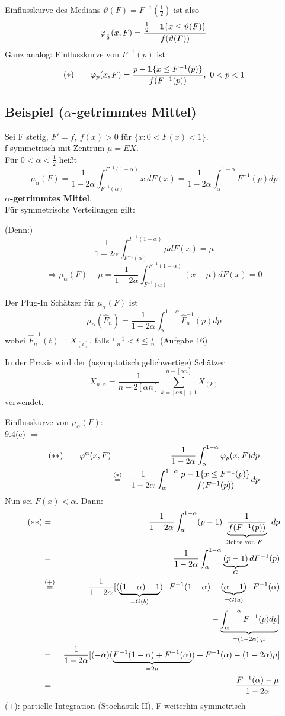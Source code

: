 \documentclass[a4paper,11pt,twoside,titlepage]{article}
\newcommand{\ind}{\text{\bf{1}}} %
\begin{document}
Einflusskurve des Medians $\vartheta(F)=F^{-1}(\frac12)$ ist also
\[\varphi_{\frac12}(x,F)=\frac{\frac12-\ind\{x\leq\vartheta(F)\}}{f(\vartheta(F))}\]
Ganz analog: Einflusskurve von $F^{-1}(p)$ ist
\[(\ast)\qquad\varphi_p(x,F)=\frac{p-\ind\{x\leq F^{-1}(p)\}}{f(F^{-1}(p))},\ 0<p<1\]

\subsection{Beispiel ($\alpha$-getrimmtes Mittel)}
Sei F stetig, $F'=f,\ f(x)>0$ für $\{x:0<F(x)<1\}$.\\
f symmetrisch mit Zentrum $\mu=EX$.\\
Für $0<\alpha<\frac12$ heißt
$$\mu_\alpha(F)=\frac{1}{1-2\alpha}\int_{F^{-1}(\alpha)}^{F^{-1}(1-\alpha)}x\ dF(x)=\frac{1}{1-2\alpha}\int_\alpha^{1-\alpha}F^{-1}(p)dp$$
\textbf{$\alpha$-getrimmtes Mittel}.\\
Für symmetrische Verteilungen gilt:\\

(Denn:)
$$\frac{1}{1-2\alpha}\int_{F^{-1}(\alpha)}^{F^{-1}(1-\alpha)}\mu dF(x)=\mu$$
$$\Rightarrow\mu_\alpha(F)-\mu=\frac{1}{1-2\alpha}\int_{F^{-1}(\alpha)}^{F^{-1}(1-\alpha)}(x-\mu)dF(x)=0$$

Der Plug-In Schätzer für $\mu_\alpha(F)$ ist 
$$\mu_\alpha(\hat F_n)=\frac{1}{1-2\alpha}\int_{\alpha}^{1-\alpha}
\hat F_n^{-1}(p)dp$$
wobei $\hat F_n^{-1}(t)=X_{(i)}$, falls $\frac{i-1}{n}<t\leq\frac{i}{n}$. (Aufgabe 16)

In der Praxis wird der (asymptotisch gelichwertige) Schätzer
$$\bar X_{n,\alpha}=\frac{1}{n-2[\alpha n]}\sum_{k=[\alpha n]+1}^{n-[\alpha n]}X_{(k)}$$
verwendet.

Einflusskurve von $\mu_\alpha(F)$:\\
9.4(c) $\Rightarrow$
\begin{eqnarray*}(\ast\ast)\qquad \varphi^\alpha(x,F)&=&\frac{1}{1-2\alpha}\int_\alpha^{1-\alpha}\varphi_p(x,F)dp\\&\stackrel{(\ast)}{=}&\frac{1}{1-2\alpha}\int_\alpha^{1-\alpha}\frac{p-\ind\{x\leq F^{-1}(p)\}}{f(F^{-1}(p))}dp\end{eqnarray*}
Nun sei $F(x)<\alpha$. Dann:
\begin{eqnarray*}
(\ast\ast)&=&\frac{1}{1-2\alpha}\int_\alpha^{1-\alpha}(p-1)\underbrace{\frac{1}{f(F^{-1}(p))}}_{\textnormal{Dichte von }F^{-1}}dp\\
&=&\frac{1}{1-2\alpha}\int_\alpha^{1-\alpha}\underbrace{(p-1)}_{G}dF^{-1}(p)\\
&\stackrel{(+)}{=}&\frac{1}{1-2\alpha}[(\underbrace{(1-\alpha)-1}_{=G(b)})\cdot F^{-1}(1-\alpha)-(\underbrace{\alpha-1}_{=G(a)})\cdot F^{-1}(\alpha)\\&&\qquad\qquad-\underbrace{\int_\alpha^{1-\alpha}F^{-1}(p)dp}_{=(1-2\alpha)\cdot\mu}]\\
&=&\frac{1}{1-2\alpha}[(-\alpha)(\underbrace{F^{-1}(1-\alpha)+F^{-1}(\alpha)}_{=2\mu})+F^{-1}(\alpha)-(1-2\alpha)\mu]\\
&=&\frac{F^{-1}(\alpha)-\mu}{1-2\alpha}\end{eqnarray*}
(+): partielle Integration (Stochastik II), F weiterhin symmetrisch
\end{document}
